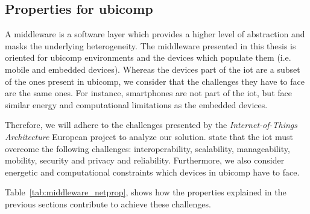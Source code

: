 \subsection{Properties for \acs{ubicomp}}
\label{sec:middleware_properties}

A middleware is a software layer which provides a higher level of abstraction and masks the underlying heterogeneity.
The middleware presented in this thesis is oriented for \ac{ubicomp} environments and the devices which populate them (i.e. mobile and embedded devices).
Whereas the devices part of the \ac{iot} are a subset of the ones present in \ac{ubicomp}, we consider that the challenges they have to face are the same ones.
For instance, smartphones are not part of the \ac{iot}, but face similar energy and computational limitations as the embedded devices. %

Therefore, we will adhere to the challenges presented by the \emph{Internet-of-Things Architecture} European project \citep{walewski_project_2011} to analyze our solution.
\citeauthor{walewski_project_2011} state that the \ac{iot} must overcome the following challenges:
interoperability, scalability, manageability, mobility, security and privacy and reliability.
Furthermore, we also consider energetic and computational constraints which devices in \ac{ubicomp} have to face. %


Table~\ref{tab:middleware_netprop}, shows how the properties explained in the previous sections contribute to achieve these challenges.







